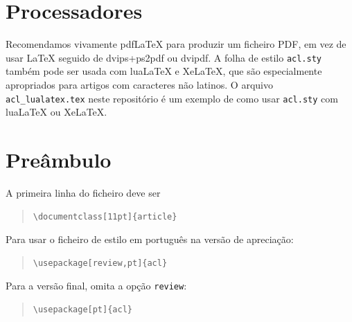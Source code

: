 \documentclass[11pt]{article}
\begin{document}
\section{Processadores}

Recomendamos vivamente pdf\LaTeX{} para produzir um ficheiro PDF, em vez de usar \LaTeX{} seguido de dvips+ps2pdf ou dvipdf.
A folha de estilo \texttt{acl.sty} também pode ser usada com lua\LaTeX{} e Xe\LaTeX{}, que são especialmente apropriados para artigos com caracteres não latinos.
O arquivo \texttt{acl\_lualatex.tex} neste repositório é um exemplo de como usar \texttt{acl.sty} com lua\LaTeX{} ou Xe\LaTeX{}.

\section{Preâmbulo}

A primeira linha do ficheiro deve ser
\begin{quote}
\begin{verbatim}
\documentclass[11pt]{article}
\end{verbatim}
\end{quote}

Para usar o ficheiro de estilo em português na versão de apreciação:
\begin{quote}
\begin{verbatim}
\usepackage[review,pt]{acl}
\end{verbatim}
\end{quote}

Para a versão final, omita a opção \verb|review|:
\begin{quote}
\begin{verbatim}
\usepackage[pt]{acl}
\end{verbatim}
\end{quote}
\end{document}
